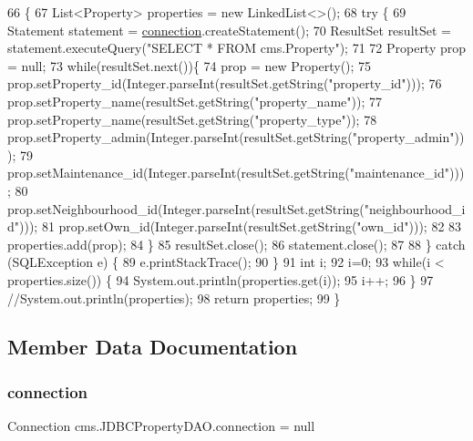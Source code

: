 \begin{DoxyCode}
66                                    \{
67         List<Property> properties = \textcolor{keyword}{new} LinkedList<>();
68          \textcolor{keywordflow}{try} \{
69                 Statement statement = \mbox{\hyperlink{classcms_1_1_j_d_b_c_property_d_a_o_abf9c487234968fce867ee559ed4ccd59}{connection}}.createStatement();
70                 ResultSet resultSet = statement.executeQuery(\textcolor{stringliteral}{"SELECT * FROM cms.Property"});
71                  
72                 Property prop = null;
73                 \textcolor{keywordflow}{while}(resultSet.next())\{
74                     prop = \textcolor{keyword}{new} Property();
75                     prop.setProperty\_id(Integer.parseInt(resultSet.getString(\textcolor{stringliteral}{"property\_id"})));
76                     prop.setProperty\_name(resultSet.getString(\textcolor{stringliteral}{"property\_name"}));
77                     prop.setProperty\_name(resultSet.getString(\textcolor{stringliteral}{"property\_type"}));
78                     prop.setProperty\_admin(Integer.parseInt(resultSet.getString(\textcolor{stringliteral}{"property\_admin"})));
79                     prop.setMaintenance\_id(Integer.parseInt(resultSet.getString(\textcolor{stringliteral}{"maintenance\_id"})));
80                     prop.setNeighbourhood\_id(Integer.parseInt(resultSet.getString(\textcolor{stringliteral}{"neighbourhood\_id"})));
81                     prop.setOwn\_id(Integer.parseInt(resultSet.getString(\textcolor{stringliteral}{"own\_id"})));
82                     
83                     properties.add(prop);
84                 \}
85                 resultSet.close();
86                 statement.close();
87                  
88             \} \textcolor{keywordflow}{catch} (SQLException e) \{
89                 e.printStackTrace();
90             \}
91             \textcolor{keywordtype}{int} i;
92             i=0;
93             \textcolor{keywordflow}{while}(i < properties.size()) \{
94                     System.out.println(properties.get(i));
95                     i++;
96              \}
97             \textcolor{comment}{//System.out.println(properties);}
98             \textcolor{keywordflow}{return} properties;
99     \}
\end{DoxyCode}


\subsection{Member Data Documentation}
\mbox{\label{classcms_1_1_j_d_b_c_property_d_a_o_abf9c487234968fce867ee559ed4ccd59}} 
\subsubsection{\texorpdfstring{connection}{connection}}
{\footnotesize\ttfamily Connection cms.\+J\+D\+B\+C\+Property\+D\+A\+O.\+connection = null\hspace{0.3cm}{\ttfamily [package]}}

